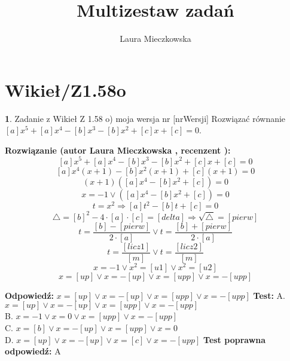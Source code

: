 \documentclass[12pt, a4paper]{article}
\title{Multizestaw zadań}
\author{Laura Mieczkowska}
\date{}
\theoremstyle{definition} %
\newtheorem{zad}{}
\newcommand{\kategoria}[1]{\section{#1}} %
\newcommand{\zadStart}[1]{\begin{zad}#1\newline} %
\newcommand{\zadStop}{\end{zad}}   %
\newcommand{\rozwStart}[2]{\noindent \textbf{Rozwiązanie (autor #1 , recenzent #2): }\newline} %
\newcommand{\odpStart}{\noindent \textbf{Odpowiedź:}\newline}    %
\newcommand{\odpStop}{\newline}                                             %
\newcommand{\testStart}{\noindent \textbf{Test:}\newline} %
\newcommand{\testStop}{\newline} %
\newcommand{\kluczStart}{\noindent \textbf{Test poprawna odpowiedź:}\newline} %
\newcommand{\kluczStop}{\newline} %
\begin{document}
\maketitle


\kategoria{Wikieł/Z1.58o}
\zadStart{Zadanie z Wikieł Z 1.58 o) moja wersja nr [nrWersji]}
Rozwiązać równanie $[a]x^5+[a]x^4-[b]x^3-[b]x^2+[c]x+[c]=0$.
\zadStop
\rozwStart{Laura Mieczkowska}{}
$$[a]x^5+[a]x^4-[b]x^3-[b]x^2+[c]x+[c]=0$$
$$[a]x^4(x+1)-[b]x^2(x+1)+[c](x+1)=0$$
$$(x+1)([a]x^4-[b]x^2+[c])=0$$
$$x=-1 \vee ([a]x^4-[b]x^2+[c])=0$$
$$t=x^2 \Rightarrow [a]t^2-[b]t+[c]=0$$
$$\triangle=[b]^2-4\cdot [a] \cdot [c]=[delta] \Rightarrow \sqrt{\triangle}=[pierw]$$
$$t=\frac{[b]-[pierw]}{2\cdot[a]} \vee t=\frac{[b]+[pierw]}{2\cdot[a]}$$
$$t=\frac{[licz1]}{[m]} \vee t=\frac{[licz2]}{[m]}$$
$$x=-1 \vee x^2=[u1] \vee x^2=[u2]$$
$$x=[up] \vee x=-[up] \vee x=[upp] \vee x=-[upp]$$

\odpStart
$x=[up] \vee x=-[up] \vee x=[upp] \vee x=-[upp]$
\odpStop
\testStart
A. $x=[up] \vee x=-[up] \vee x=[upp] \vee x=-[upp]$ \\
B. $x=-1 \vee x=0 \vee x=[upp] \vee x=-[upp]$ \\
C. $x=[b] \vee x=-[up] \vee x=[upp] \vee x=0$ \\
D. $x=[up] \vee x=-[up] \vee x=[c] \vee x=-[upp]$ 
\testStop
\kluczStart
A
\kluczStop
\end{document}
